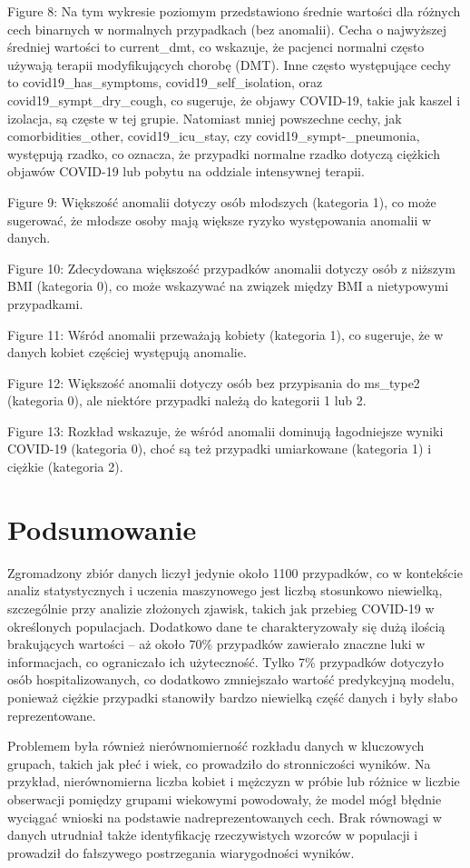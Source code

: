 \documentclass[a4paper,fleqn]{cas-dc}
\begin{document}
Figure 8: Na tym wykresie poziomym przedstawiono średnie wartości dla różnych cech binarnych w normalnych przypadkach (bez anomalii). Cecha o najwyższej średniej wartości to current\_dmt, co wskazuje, że pacjenci normalni często używają terapii modyfikujących chorobę (DMT). Inne często występujące cechy to covid19\_has\_symptoms, covid19\_self\_isolation, oraz covid19\_sympt\_dry\_cough, co sugeruje, że objawy COVID-19, takie jak kaszel i izolacja, są częste w tej grupie. Natomiast mniej powszechne cechy, jak comorbidities\_other, covid19\_icu\_stay, czy covid19\_sympt-\_pneumonia, występują rzadko, co oznacza, że przypadki normalne rzadko dotyczą ciężkich objawów COVID-19 lub pobytu na oddziale intensywnej terapii.

Figure 9: Większość anomalii dotyczy osób młodszych (kategoria 1), co może sugerować, że młodsze osoby mają większe ryzyko występowania anomalii w danych.

Figure 10: Zdecydowana większość przypadków anomalii dotyczy osób z niższym BMI (kategoria 0), co może wskazywać na związek między BMI a nietypowymi przypadkami.

Figure 11: Wśród anomalii przeważają kobiety (kategoria 1), co sugeruje, że w danych kobiet częściej występują anomalie.

Figure 12: Większość anomalii dotyczy osób bez przypisania do ms\_type2 (kategoria 0), ale niektóre przypadki należą do kategorii 1 lub 2.

Figure 13: Rozkład wskazuje, że wśród anomalii dominują łagodniejsze wyniki COVID-19 (kategoria 0), choć są też przypadki umiarkowane (kategoria 1) i ciężkie (kategoria 2).

\section{Podsumowanie}
Zgromadzony zbiór danych liczył jedynie około 1100 przypadków, co w kontekście analiz statystycznych i uczenia maszynowego jest liczbą stosunkowo niewielką, szczególnie przy analizie złożonych zjawisk, takich jak przebieg COVID-19 w określonych populacjach. Dodatkowo dane te charakteryzowały się dużą ilością brakujących wartości – aż około 70\% przypadków zawierało znaczne luki w informacjach, co ograniczało ich użyteczność. Tylko 7\% przypadków dotyczyło osób hospitalizowanych, co dodatkowo zmniejszało wartość predykcyjną modelu, ponieważ ciężkie przypadki stanowiły bardzo niewielką część danych i były słabo reprezentowane.

Problemem była również nierównomierność rozkładu danych w kluczowych grupach, takich jak płeć i wiek, co prowadziło do stronniczości wyników. Na przykład, nierównomierna liczba kobiet i mężczyzn w próbie lub różnice w liczbie obserwacji pomiędzy grupami wiekowymi powodowały, że model mógł błędnie wyciągać wnioski na podstawie nadreprezentowanych cech. Brak równowagi w danych utrudniał także identyfikację rzeczywistych wzorców w populacji i prowadził do fałszywego postrzegania wiarygodności wyników.
\end{document}
